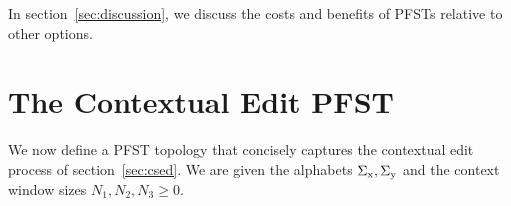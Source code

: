\documentclass[11pt,letterpaper]{article}
\newcommand{\Sigmax}{\Sigma_{\text x}}
\newcommand{\Sigmay}{\Sigma_{\text y}}
\newcommand{\ryan}[1]{\todo[color=green!40,author=Ryan]{#1}}
\begin{document}
In section~\ref{sec:discussion}, we discuss the costs and benefits of 
\mbox{PFSTs} relative to other options.

\section{The Contextual Edit PFST}


We now define a PFST topology that concisely captures the contextual edit process of section~\ref{sec:csed}.  We are given the alphabets $\Sigmax, \Sigmay$ and the context window sizes $N_1, N_2, N_3 \geq 0$.


\end{document}
